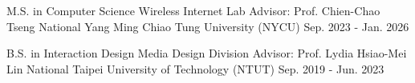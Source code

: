 \vspace{-0.6cm} %
\vspace{-0.25cm} 

\begin{cventries}

  \cventry
    {M.S. in Computer Science \textbar{} Wireless Internet Lab \textbar{} Advisor: Prof. Chien-Chao Tseng} %
    {National Yang Ming Chiao Tung University (NYCU)} %
    {Sep. 2023 - Jan. 2026} %
    {} %
    {} %

  \vspace{-0.5cm} %

  \cventry
    {B.S. in Interaction Design \textbar{} Media Design Division \textbar{} Advisor: Prof. Lydia Hsiao-Mei Lin} %
    {National Taipei University of Technology (NTUT)} %
    {Sep. 2019 - Jun. 2023} %
    {} %
    {} %

  \vspace{-1.0cm} %
\end{cventries}
